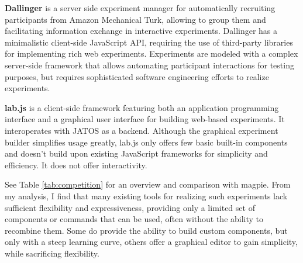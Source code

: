 \documentclass[a4paper,10pt]{paper}
\begin{document}
\textbf{Dallinger} \citep{Suchow2016} is a server side experiment manager for automatically recruiting participants from Amazon Mechanical Turk, allowing to group them and facilitating information exchange in interactive experiments. Dallinger has a minimalistic client-side JavaScript API, requiring the use of third-party libraries for implementing rich web experiments. Experiments are modeled with a complex server-side framework that allows automating participant interactions for testing purposes, but requires sophisticated software engineering efforts to realize experiments.

\textbf{lab.js} \citep{Henninger2020} is a client-side framework featuring both an application programming interface and a graphical user interface  for building web-based experiments. It interoperates with JATOS \citep{Lange2015} as a backend. Although the graphical experiment builder simplifies usage greatly, lab.js only offers few basic built-in components and doesn't build upon existing JavaScript frameworks for simplicity and efficiency. It does not offer interactivity.

See Table \ref{tab:competition} for an overview and comparison with magpie. From my analysis, I find that many existing tools for realizing such experiments lack sufficient flexibility and expressiveness, providing only a limited set of components or commands that can be used, often without the ability to recombine them. Some do provide the ability to build custom components, but only with a steep learning curve, others offer a graphical editor to gain simplicity, while sacrificing flexibility.
\end{document}
